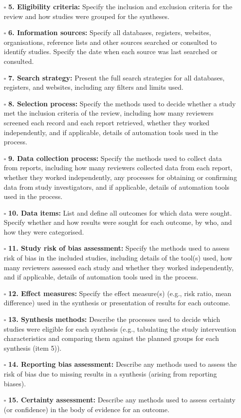 \documentclass[11pt]{article}
\def\tightlist{}
\begin{document}
\begin{Form}
\begin{itemize}
\tightlist
\item[$\square$]
  \textbf{5. Eligibility criteria:} Specify the inclusion and exclusion
  criteria for the review and how studies were grouped for the
  syntheses.
\item[$\square$]
  \textbf{6. Information sources:} Specify all databases, registers,
  websites, organisations, reference lists and other sources searched or
  consulted to identify studies. Specify the date when each source was
  last searched or consulted.
\item[$\square$]
  \textbf{7. Search strategy:} Present the full search strategies for
  all databases, registers, and websites, including any filters and
  limits used.
\item[$\square$]
  \textbf{8. Selection process:} Specify the methods used to decide
  whether a study met the inclusion criteria of the review, including
  how many reviewers screened each record and each report retrieved,
  whether they worked independently, and if applicable, details of
  automation tools used in the process.
\item[$\square$]
  \textbf{9. Data collection process:} Specify the methods used to
  collect data from reports, including how many reviewers collected data
  from each report, whether they worked independently, any processes for
  obtaining or confirming data from study investigators, and if
  applicable, details of automation tools used in the process.
\item[$\square$]
  \textbf{10. Data items:} List and define all outcomes for which data
  were sought. Specify whether and how results were sought for each
  outcome, by who, and how they were categorised.
\item[$\square$]
  \textbf{11. Study risk of bias assessment:} Specify the methods used
  to assess risk of bias in the included studies, including details of
  the tool(s) used, how many reviewers assessed each study and whether
  they worked independently, and if applicable, details of automation
  tools used in the process.
\item[$\square$]
  \textbf{12. Effect measures:} Specify the effect measure(s) (e.g.,
  risk ratio, mean difference) used in the synthesis or presentation of
  results for each outcome.
\item[$\square$]
  \textbf{13. Synthesis methods:} Describe the processes used to decide
  which studies were eligible for each synthesis (e.g., tabulating the
  study intervention characteristics and comparing them against the
  planned groups for each synthesis (item 5)).
\item[$\square$]
  \textbf{14. Reporting bias assessment:} Describe any methods used to
  assess the risk of bias due to missing results in a synthesis (arising
  from reporting biases).
\item[$\square$]
  \textbf{15. Certainty assessment:} Describe any methods used to assess
  certainty (or confidence) in the body of evidence for an outcome.
\end{itemize}


\end{Form}
\end{document}
